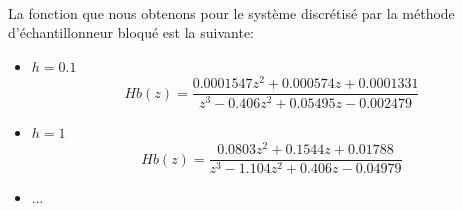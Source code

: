 \paragraph{}
La fonction que nous obtenons pour le système discrétisé par la méthode d'échantillonneur bloqué est la suivante:
\begin{itemize}[label=$\cdot$, itemsep=1em]
\item $h=0.1$
\begin{equation}
Hb(z) = \frac{0.0001547 z^{2} + 0.000574z + 0.0001331}{z^{3} - 0.406 z^{2} + 0.05495z - 0.002479}
\end{equation}

\item $h=1$
\begin{equation}
Hb(z) = \frac{0.0803 z^{2} + 0.1544z + 0.01788}{z^{3} - 1.104 z^{2} + 0.406z - 0.04979}
\end{equation}

\item ...
\end{itemize}

